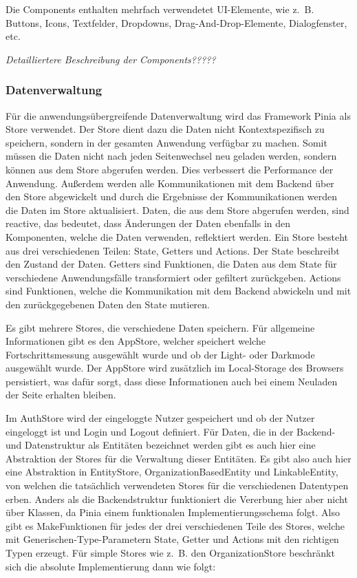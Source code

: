 Die Components enthalten mehrfach verwendetet UI-Elemente, wie z. B. Buttons, Icons, Textfelder, Dropdowns, Drag-And-Drop-Elemente, Dialogfenster, etc.

\emph{Detailliertere Beschreibung der Components?????}

\subsubsection{Datenverwaltung}
Für die anwendungsübergreifende Datenverwaltung wird das Framework Pinia als Store verwendet. Der Store dient dazu die Daten nicht Kontextspezifisch zu speichern, sondern in der gesamten Anwendung verfügbar zu machen. Somit müssen die Daten nicht nach jeden Seitenwechsel neu geladen werden, sondern können aus dem Store abgerufen werden. Dies verbessert die Performance der Anwendung. Außerdem werden alle Kommunikationen mit dem Backend über den Store abgewickelt und durch die Ergebnisse der Kommunikationen werden die Daten im Store aktualisiert. Daten, die aus dem Store abgerufen werden, sind reactive, das bedeutet, dass Änderungen der Daten ebenfalls in den Komponenten, welche die Daten verwenden, reflektiert werden. Ein Store besteht aus drei verschiedenen Teilen: State, Getters und Actions. Der State beschreibt den Zustand der Daten. Getters sind Funktionen, die Daten aus dem State für verschiedene Anwendungsfälle transformiert oder gefiltert zurückgeben. Actions sind Funktionen, welche die Kommunikation mit dem Backend abwickeln und mit den zurückgegebenen Daten den State mutieren.

Es gibt mehrere Stores, die verschiedene Daten speichern. Für allgemeine Informationen gibt es den AppStore, welcher speichert welche Fortschrittsmessung ausgewählt wurde und ob der Light- oder Darkmode ausgewählt wurde. Der AppStore wird zusätzlich im Local-Storage des Browsers persistiert, was dafür sorgt, dass diese Informationen auch bei einem Neuladen der Seite erhalten bleiben.

Im AuthStore wird der eingeloggte Nutzer gespeichert und ob der Nutzer eingeloggt ist und Login und Logout definiert.
Für Daten, die in der Backend- und Datenstruktur als Entitäten bezeichnet werden gibt es auch hier eine Abstraktion der Stores für die Verwaltung dieser Entitäten. Es gibt also auch hier eine Abstraktion in EntityStore, OrganizationBasedEntity und LinkableEntity, von welchen die tatsächlich verwendeten Stores für die verschiedenen Datentypen erben. Anders als die Backendstruktur funktioniert die Vererbung hier aber nicht über Klassen, da Pinia einem funktionalen Implementierungsschema folgt. Also gibt es MakeFunktionen für jedes der drei verschiedenen Teile des Stores, welche mit Generischen-Type-Parametern State, Getter und Actions mit den richtigen Typen erzeugt. Für simple Stores wie z. B. den OrganizationStore beschränkt sich die absolute Implementierung dann wie folgt:

